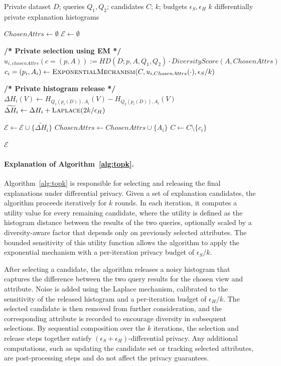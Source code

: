 \begin{algorithm}[t]
\caption{Find-Top-$k$-Explanations}
\label{alg:topk}
\begin{algorithmic}[1]
\Require Private dataset $D$; queries $Q_1,Q_2$; candidates $C$; $k$; budgets $\epsilon_S,\epsilon_H$
\Ensure $k$ differentially private explanation histograms

\State $ChosenAttrs \gets \emptyset$
\State $\mathcal{E} \gets \emptyset$


  \State \textbf{/* Private selection using EM */}
  \State $u_{i,chosenAttrs}(c=(p,A)) := HD(D; p,A,Q_1,Q_2) \cdot DiversityScore(A,ChosenAttrs)$
  \State $c_i=(p_i,A_i) \gets \textsc{ExponentialMechanism}( \newline C, u_{i, ChosenAttrs}(\cdot), \epsilon_S/k)$

  \State \textbf{/* Private histogram release */}
  \State $\Delta H_i(V) \gets H_{Q_1(p_i(D)),A_i}(V)-H_{Q_2(p_i(D)),A_i}(V)$
  \State $\widetilde{\Delta H_i} \gets \Delta H_i + \textsc{Laplace}(2k/\epsilon_H)$

  \State $\mathcal{E} \gets \mathcal{E} \cup \{\widetilde{\Delta H_i}\}$
  \State $ChosenAttrs \gets ChosenAttrs \cup \{A_i\}$
  \State $C \gets C \setminus \{c_i\}$

\EndFor


\State \Return $\mathcal{E}$
\end{algorithmic}
\end{algorithm}

\paragraph{Explanation of Algorithm~\ref{alg:topk}.}
Algorithm~\ref{alg:topk} is responsible for selecting and releasing the final explanations under differential privacy. Given a set of explanation candidates, the algorithm proceeds iteratively for $k$ rounds. In each iteration, it computes a utility value for every remaining candidate, where the utility is defined as the histogram distance between the results of the two queries, optionally scaled by a diversity-aware factor that depends only on previously selected attributes. The bounded sensitivity of this utility function allows the algorithm to apply the exponential mechanism with a per-iteration privacy budget of $\epsilon_S/k$.

After selecting a candidate, the algorithm releases a noisy histogram that captures the difference between the two query results for the chosen view and attribute. Noise is added using the Laplace mechanism, calibrated to the sensitivity of the released histogram and a per-iteration budget of $\epsilon_H/k$. The selected candidate is then removed from further consideration, and the corresponding attribute is recorded to encourage diversity in subsequent selections. By sequential composition over the $k$ iterations, the selection and release steps together satisfy $(\epsilon_S + \epsilon_H)$-differential privacy. Any additional computations, such as updating the candidate set or tracking selected attributes, are post-processing steps and do not affect the privacy guarantees.


